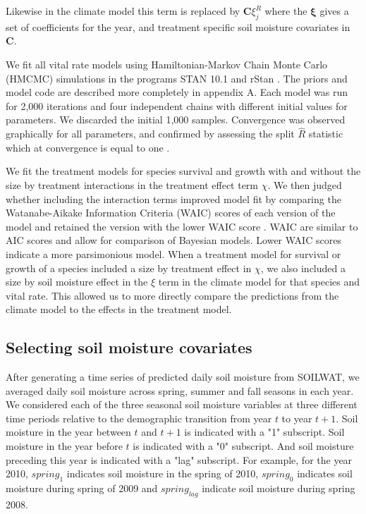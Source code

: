 \documentclass[11pt]{article}
\begin{document}
\begin{doublespacing}
Likewise in the climate model this term is replaced by $\boldsymbol{C}\xi_{j}^R$ where the $\boldsymbol{\xi}$ gives a set of coefficients for the year, and treatment specific soil moisture covariates in $\boldsymbol{C}$.

We fit all vital rate models using Hamiltonian-Markov Chain Monte Carlo (HMCMC) simulations in the programs STAN 10.1 and rStan \citep{}. The priors and model code are described more completely in appendix A. Each model was run for 2,000 iterations and four independent chains with different initial values for parameters. We discarded the initial 1,000 samples. Convergence was observed graphically for all parameters, and confirmed by assessing the split $\widehat{R}$ statistic which at convergence is equal to one \citep{}. 

We fit the treatment models for species survival and growth with and without the size by treatment interactions in the treatment effect term $\chi$. We then judged whether including the interaction terms improved model fit by comparing the Watanabe-Aikake Information Criteria (WAIC) scores of each version of the model and retained the version with the lower WAIC score \citep{vetari_practical_2015}. WAIC are similar to AIC scores and allow for comparison of Bayesian models. Lower WAIC scores indicate a more parsimonious model. When a treatment model for survival or growth of a species included a size by treatment effect in $\chi$, we also included a size by soil moisture effect in the $\xi$ term in the climate model for that species and vital rate. This allowed us to more directly compare the predictions from the climate model to the effects in the treatment model.

\subsection*{Selecting soil moisture covariates}

After generating a time series of predicted daily soil moisture from SOILWAT, we averaged daily soil moisture across spring, summer and fall seasons in each year. We considered each of the three seasonal soil moisture variables at three different time periods relative to the demographic transition from year $t$ to year $t+1$.  Soil moisture in the year between $t$ and $t+1$ is indicated with a "1" subscript.  Soil moisture in the year before $t$ is indicated with a "0" subscript. And soil moisture preceding this year is indicated with a "lag" subscript. For example, for the year 2010, $spring_1$ indicates soil moisture in the spring of 2010, $spring_0$ indicates soil moisture during spring of 2009 and $spring_{lag}$ indicate soil moisture during spring 2008.   


\end{doublespacing}
\end{document}
